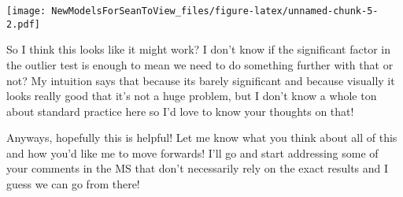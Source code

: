 \documentclass[]{article}
\begin{document}
\texttt{[image: NewModelsForSeanToView\_files/figure-latex/unnamed-chunk-5-2.pdf]}

So I think this looks like it might work? I don't know if the
significant factor in the outlier test is enough to mean we need to do
something further with that or not? My intuition says that because its
barely significant and because visually it looks really good that it's
not a huge problem, but I don't know a whole ton about standard practice
here so I'd love to know your thoughts on that!

Anyways, hopefully this is helpful! Let me know what you think about all
of this and how you'd like me to move forwards! I'll go and start
addressing some of your comments in the MS that don't necessarily rely
on the exact results and I guess we can go from there!
\end{document}
